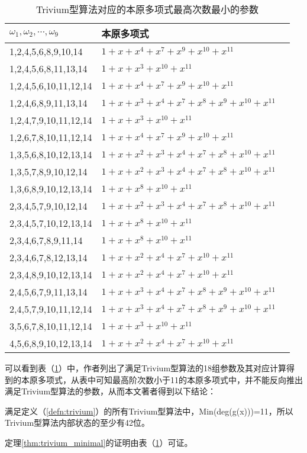 \begin{table}[H]
  \label{table:trivium_minimal}
  \centering
  \caption{Trivium型算法对应的本原多项式最高次数最小的参数}
  \begin{tabular}{@{}llr@{}} \toprule
    $\omega_{1},\omega_{2},\cdots,\omega_{9}$ & 本原多项式 \\ 
    \midrule
    1,2,4,5,6,8,9,10,14 & $1+x+x^{4}+x^{7}+x^{9}+x^{10}+x^{11}$ \\
    1,2,4,5,6,8,11,13,14 & $1+x+x^{3}+x^{10}+x^{11}$ \\
    1,2,4,5,6,10,11,12,14 & $1+x+x^{4}+x^{7}+x^{9}+x^{10}+x^{11}$ \\
    1,2,4,6,8,9,11,13,14 & $1+x+x^{3}+x^{4}+x^{7}+x^{8}+x^{9}+x^{10}+x^{11}$ \\
    1,2,4,7,9,10,11,12,14 & $1+x+x^{3}+x^{10}+x^{11}$ \\
    1,2,6,7,8,10,11,12,14 & $1+x+x^{4}+x^{7}+x^{9}+x^{10}+x^{11}$ \\
    1,3,5,6,8,10,12,13,14 & $1+x+x^{2}+x^{3}+x^{4}+x^{7}+x^{8}+x^{10}+x^{11}$ \\
    1,3,5,7,8,9,10,12,14 & $1+x+x^{2}+x^{3}+x^{4}+x^{7}+x^{8}+x^{10}+x^{11}$ \\
    1,3,6,8,9,10,12,13,14 & $1+x+x^{8}+x^{10}+x^{11}$ \\
    2,3,4,5,7,9,10,12,14 & $1+x+x^{2}+x^{3}+x^{4}+x^{7}+x^{8}+x^{10}+x^{11}$ \\
    2,3,4,5,7,10,12,13,14 & $1+x+x^{8}+x^{10}+x^{11}$ \\
    2,3,4,6,7,8,9,11,14 & $1+x+x^{8}+x^{10}+x^{11}$ \\
    2,3,4,6,7,8,12,13,14 & $1+x+x^{2}+x^{4}+x^{7}+x^{10}+x^{11}$ \\
    2,3,4,8,9,10,12,13,14 & $1+x+x^{2}+x^{4}+x^{7}+x^{10}+x^{11}$ \\
    2,4,5,6,7,9,11,13,14  & $1+x+x^{3}+x^{4}+x^{7}+x^{8}+x^{9}+x^{10}+x^{11}$ \\
    2,4,5,7,9,10,11,12,14 & $1+x+x^{3}+x^{4}+x^{7}+x^{8}+x^{9}+x^{10}+x^{11}$ \\
    3,5,6,7,8,10,11,12,14 & $1+x+x^{3}+x^{10}+x^{11}$ \\
    4,5,6,8,9,10,12,13,14 & $1+x+x^{2}+x^{4}+x^{7}+x^{10}+x^{11}$ \\
\end{tabular}
\end{table}

可以看到表（\ref{table:trivium_minimal}）中，作者列出了满足Trivium型算法的18组参数及其对应计算得到的本原多项式，从表中可知最高阶次数小于11的本原多项式中，并不能反向推出满足Trivium型算法的参数，从而本文著者得到以下结论：
\begin{thm}[Trivium型算法对应的本原多项式最高次数最小为11]
\label{thm:trivium_minimal}
满足定义（\ref{defn:trivium}）的所有Trivium型算法中，Min(deg(g(x)))=11，所以Trivium型算法内部状态的至少有42位。

定理\ref{thm:trivium_minimal}的证明由表（\ref{table:trivium_minimal}）可证。
\end{thm}

